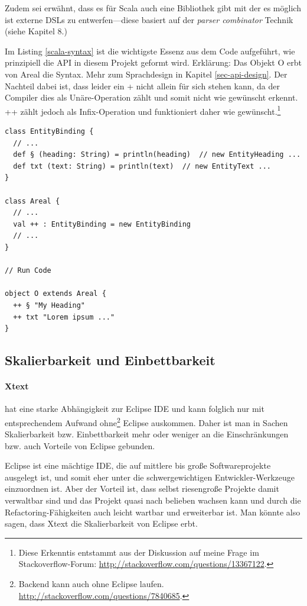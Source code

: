 Zudem sei erwähnt, dass es für Scala auch eine Bibliothek gibt mit
der es möglich ist externe DSLs zu entwerfen---diese basiert auf der
\emph{parser combinator} Technik (siehe \cite{dsls} Kapitel 8.)

Im Listing \ref{scala-syntax} ist die wichtigste Essenz aus dem Code
aufgeführt, wie prinzipiell die API in diesem Projekt geformt wird.
Erklärung: Das Objekt O erbt von Areal die Syntax.
Mehr zum Sprachdesign in Kapitel \ref{sec-api-design}.
Der Nachteil dabei ist,
dass leider ein + nicht allein für sich stehen kann, da der Compiler dies
als Unäre-Operation zählt und somit nicht wie gewünscht erkennt. ++ zählt jedoch
als Infix-Operation und funktioniert daher wie gewünscht.\footnote{
Diese Erkenntis entstammt aus der Diskussion auf meine Frage im Stackoverflow-Forum:
\url{http://stackoverflow.com/questions/13367122}.}

\begin{lstlisting}[label=scala-syntax,caption=Scala DSL Syntax und Bindung an API.]
class EntityBinding {
  // ...
  def § (heading: String) = println(heading)  // new EntityHeading ...
  def txt (text: String) = println(text)  // new EntityText ...
}

class Areal {
  // ...
  val ++ : EntityBinding = new EntityBinding
  // ...
}

// Run Code

object O extends Areal {
  ++ § "My Heading"
  ++ txt "Lorem ipsum ..."
}
\end{lstlisting}

\subsection{Skalierbarkeit und Einbettbarkeit}\label{sec-scalierEinbett}

\paragraph{Xtext} hat eine starke Abhängigkeit
zur Eclipse IDE und kann folglich nur mit entsprechendem Aufwand
ohne\footnote{ Backend kann auch ohne Eclipse laufen.
\url{http://stackoverflow.com/questions/7840685}.}
Eclipse auskommen. Daher ist man in Sachen Skalierbarkeit bzw. Einbettbarkeit
mehr oder weniger an die Einschränkungen bzw. auch Vorteile von Eclipse gebunden.

Eclipse ist eine mächtige IDE, die auf mittlere bis große Softwareprojekte
ausgelegt ist, und somit eher unter die schwergewichtigen Entwickler-Werkzeuge
einzuordnen ist. Aber der Vorteil ist, dass selbst riesengroße Projekte
damit verwaltbar sind und das Projekt quasi nach belieben wachsen kann und
durch die Refactoring-Fähigkeiten auch leicht wartbar und erweiterbar ist.
Man könnte also sagen, dass Xtext die Skalierbarkeit von Eclipse erbt.

